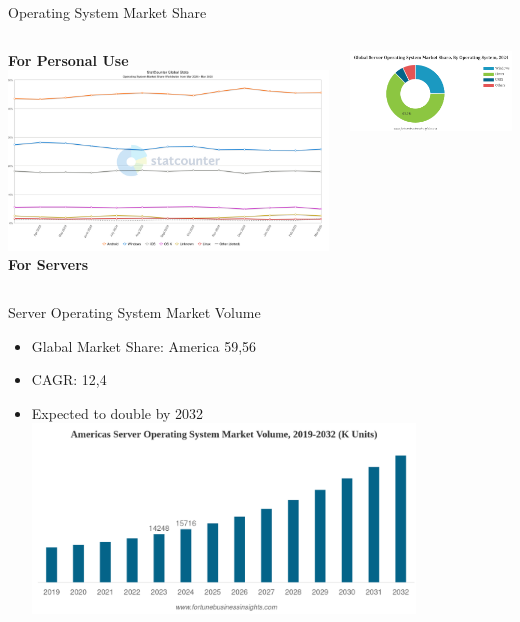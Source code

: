 \documentclass{beamer}
\begin{document}
\begin{frame}{Operating System Market Share} 
  \begin{columns}
      \textbf{For Personal Use}
      \includegraphics[width=\textwidth]{StatCounter.png}
      \textbf{For Servers}
      
      \includegraphics[width=\textwidth]{ServerOSShare.png}
  \end{columns}
\end{frame}

\begin{frame}{Server Operating System Market Volume} 
  \begin{itemize}
    \item Glabal Market Share: America 59,56\text{\%}
    \item CAGR: 12,4\text{\%}
    \item Expected to double by 2032
    \includegraphics[width=0.8\textwidth]{Server-Market-Volume.png}
  \end{itemize}
\end{frame}
\end{document}
